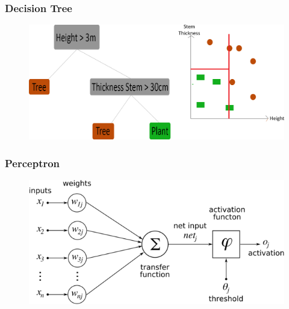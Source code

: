 \documentclass{beamer}
\begin{document}

\begin{frame}
\frametitle{Decision Tree}

	\begin{figure}
		\centering
   	 	\includegraphics[width=\textwidth,scale=1]{./img/DTExplained.png}
	\end{figure}

\end{frame}


\begin{frame} 
\frametitle{Perceptron}

	\begin{figure}
		\centering
    	\includegraphics[width=\textwidth]{./img/perceptron.png}
	\end{figure}

\end{frame}

\end{document}
